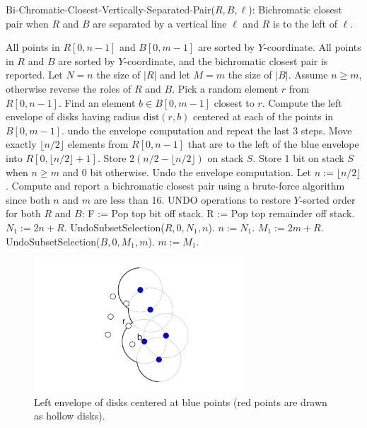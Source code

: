 \begin{algorithm}
  \caption{Bi-Chromatic-Closest-Vertically-Separated-Pair($R,B,\ell$): Bichromatic closest pair when $R$ and $B$ are separated by
    a vertical line $\ell$ and $R$ is to the left of $\ell$.} 
  \label{alg:bichromatic-separated}
  \begin{algorithmic}[1]
    \REQUIRE All points in $R[0,n-1]$ and $B[0,m-1]$ are sorted by
    $Y$-coordinate.  
    \ENSURE All points in $R$ and $B$ are sorted by
    $Y$-coordinate, and the bichromatic closest pair is reported.
    \STATE Let $N=n$ the size of $|R|$ and let $M=m$ the size of $|B|$.
        \STATE Assume $n\geq m$, otherwise reverse the roles of $R$ and $B$.
        \STATE Pick a random element $r$ from $R[0,n-1]$.
        \STATE Find an element $b \in B[0,m-1]$ closest to $r$.
        \STATE Compute the left envelope of disks having radius
               $\text{dist}(r,b)$ centered at each of the points in $B[0,m-1]$.
               \STATE undo the envelope computation and repeat the last 3 steps.
        \ELSE
               \STATE Move exactly $\lfloor n/2\rfloor$ elements from $R[0,n-1]$ that are to the left of the blue 
                      envelope into $R[0,\lfloor n/2 \rfloor +1]$. 
               \STATE Store $2(n/2 - \lfloor n/2 \rfloor)$ on stack $S$.
               \STATE Store 1 bit on stack $S$ when $n \geq m$ and 0 bit otherwise.
               \STATE Undo the envelope computation.
               \STATE Let $n := \lfloor n/2 \rfloor$.
        \ENDIF
    \ENDWHILE
    \STATE Compute and report a bichromatic closest pair using a brute-force algorithm since both $n$ and $m$ are less than 16.
    \STATE UNDO operations to restore $Y$-sorted order for both $R$ and $B$:
         \STATE F := Pop top bit off stack.
         \STATE R := Pop top remainder off stack.
            \STATE $N_1 := 2n + R$. 
            \STATE UndoSubsetSelection($R,0,N_1,n$).
            \STATE $n := N_1$.
         \ELSE 
            \STATE {}
            \STATE $M_1 := 2m + R$.
            \STATE UndoSubsetSelection($B,0,M_1,m$).
            \STATE $m := M_1$.
         \ENDIF
    \ENDWHILE
  \end{algorithmic}
\end{algorithm}

\begin{figure}
  \centerline{\includegraphics[height=5cm]{biclosest_algorithm}}
  \caption{Left envelope of disks centered at blue points (red
    points are drawn as hollow disks).}
  \label{fig:biclosest_algorithm}
\end{figure}

